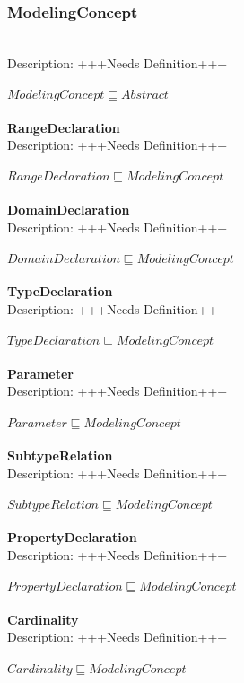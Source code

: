 \subsubsection{ModelingConcept}\\
Description: +++Needs Definition+++\\
\\$ ModelingConcept \sqsubseteq Abstract$
\\\\   \textbf{RangeDeclaration}\\Description: +++Needs Definition+++\\
\\$ RangeDeclaration \sqsubseteq ModelingConcept$
\\\\   \textbf{DomainDeclaration}\\Description: +++Needs Definition+++\\
\\$ DomainDeclaration \sqsubseteq ModelingConcept$
\\\\   \textbf{TypeDeclaration}\\Description: +++Needs Definition+++\\
\\$ TypeDeclaration \sqsubseteq ModelingConcept$
\\\\   \textbf{Parameter}\\Description: +++Needs Definition+++\\
\\$ Parameter \sqsubseteq ModelingConcept$
\\\\   \textbf{SubtypeRelation}\\Description: +++Needs Definition+++\\
\\$ SubtypeRelation \sqsubseteq ModelingConcept$
\\\\   \textbf{PropertyDeclaration}\\Description: +++Needs Definition+++\\
\\$ PropertyDeclaration \sqsubseteq ModelingConcept$
\\\\   \textbf{Cardinality}\\Description: +++Needs Definition+++\\
\\$ Cardinality \sqsubseteq ModelingConcept$
